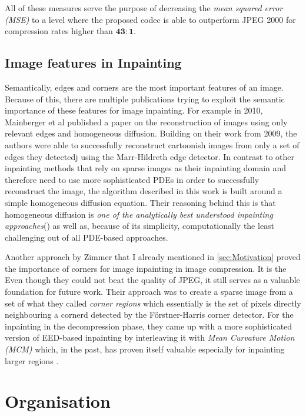     All of these measures serve the purpose of decreasing the \textit{mean squared error (MSE)} to a
level where the proposed codec is able to outperform JPEG 2000 for compression rates higher than
$\mathbf{43:1}$.

\subsection{Image features in Inpainting}

Semantically, edges and corners are the most important features of an image. Because of this, there
are multiple publications trying to exploit the semantic importance of these features for image
inpainting. For example in 2010, Mainberger et al published a paper on the reconstruction of images
using only relevant edges and homogeneous diffusion. Building on their work from 2009, the authors
were able to successfully reconstruct cartoonish images from only a set of edges they detectedj
using the Marr-Hildreth edge detector\cite{hildreth85}.
In contrast to other inpainting methods that rely on sparse images as their inpainting domain 
and therefore need to use more sophisticated PDEs in order to successfully reconstruct the image, 
the algorithm described in this work is built around a simple homogeneous diffusion equation\cite{mainberger10}. 
Their reasoning behind this is that homogeneous diffusion is \textit{one of the analytically best 
understood inpainting approaches}(\cite{mainberger10}) as well as, because of its simplicity, 
computationally the least challenging out of all PDE-based approaches.

Another approach by Zimmer that I already mentioned in \ref{sec:Motivation} proved the importance of corners
for image inpainting in image compression\cite{zimmer07}. It is the Even though they could not beat the quality of JPEG, it
still serves as a valuable foundation for future work. Their approach was to create a sparse image
from a set of what they called \textit{corner regions} which essentially is the set of pixels
directly neighbouring a cornerd detected by the F\"orstner-Harris corner
detector\cite{harris88}. For the inpainting in the decompression phase, they came up with a more
sophisticated version of EED-based inpainting by interleaving it with \textit{Mean Curvature Motion
    (MCM)} which, in the past, has proven itself valuable especially for inpainting larger regions
\cite{bertalmio00}.

\section{Organisation}

